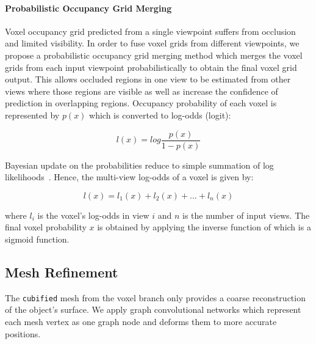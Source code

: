 \paragraph{Probabilistic Occupancy Grid Merging}
Voxel occupancy grid predicted from a single viewpoint suffers from occlusion and limited visibility. In order to fuse voxel grids from different viewpoints, we propose a probabilistic occupancy grid merging method which merges the voxel grids from each input viewpoint probabilistically to obtain the final voxel grid output. This allows occluded regions in one view to be estimated from other views where those regions are visible as well as increase the confidence of prediction in overlapping regions.
Occupancy probability of each voxel is represented by $p(x)$ which is converted to log-odds (logit):

\begin{equation}
    l(x) = log \frac{p(x)}{1 - p(x)}
    \label{equ:logodds}
\end{equation}

Bayesian update on the probabilities reduce to simple summation of log likelihoods~\cite{konolige1997improved}. Hence, the multi-view log-odds of a voxel is given by:

\begin{equation}
    l(x) = l_1(x) + l_2(x) + ... + l_n(x)
    \label{equ:logodds_sum}
\end{equation}

\noindent where $l_i$ is the voxel's log-odds in view $i$ and $n$ is the number of input views.
The final voxel probability $x$ is obtained by applying the inverse function of  which is a sigmoid function.


\subsection{Mesh Refinement}
\label{subsec:mesh_refinement}
The \texttt{cubified} mesh from the voxel branch only provides a coarse reconstruction of the object's surface. We apply graph convolutional networks which represent each mesh vertex as one graph node and deforms them to more accurate positions.

